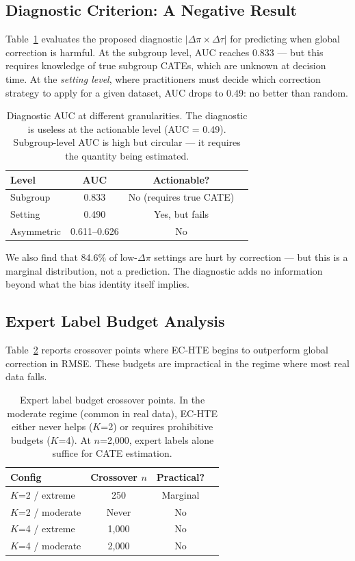 \documentclass[11pt]{article}
\begin{document}
\subsection{Diagnostic Criterion: A Negative Result}
\label{sec:diagnostic}

Table~\ref{tab:diagnostic} evaluates the proposed diagnostic $|\Delta\pi \times \Delta\tau|$ for predicting when global correction is harmful.
At the subgroup level, AUC reaches 0.833 --- but this requires knowledge of true subgroup CATEs, which are unknown at decision time.
At the \emph{setting level}, where practitioners must decide which correction strategy to apply for a given dataset, AUC drops to 0.49: no better than random.

\begin{table}[t]
\centering
\small
\begin{tabular}{lccc}
\toprule
Level & AUC & Actionable? \\
\midrule
Subgroup & 0.833 & No (requires true CATE) \\
Setting & 0.490 & Yes, but fails \\
Asymmetric & 0.611--0.626 & No \\
\bottomrule
\end{tabular}
\caption{Diagnostic AUC at different granularities. The diagnostic is useless at the actionable level (AUC = 0.49). Subgroup-level AUC is high but circular --- it requires the quantity being estimated.}
\label{tab:diagnostic}
\end{table}

We also find that 84.6\% of low-$\Delta\pi$ settings are hurt by correction --- but this is a marginal distribution, not a prediction.
The diagnostic adds no information beyond what the bias identity itself implies.

\subsection{Expert Label Budget Analysis}
\label{sec:budget}

Table~\ref{tab:budget} reports crossover points where EC-HTE begins to outperform global correction in RMSE.
These budgets are impractical in the regime where most real data falls.

\begin{table}[t]
\centering
\small
\begin{tabular}{lccl}
\toprule
Config & Crossover $n$ & Practical? \\
\midrule
$K$=2 / extreme & 250 & Marginal \\
$K$=2 / moderate & Never & No \\
$K$=4 / extreme & 1{,}000 & No \\
$K$=4 / moderate & 2{,}000 & No \\
\bottomrule
\end{tabular}
\caption{Expert label budget crossover points. In the moderate regime (common in real data), EC-HTE either never helps ($K$=2) or requires prohibitive budgets ($K$=4). At $n$=2{,}000, expert labels alone suffice for CATE estimation.}
\label{tab:budget}
\end{table}
\end{document}
